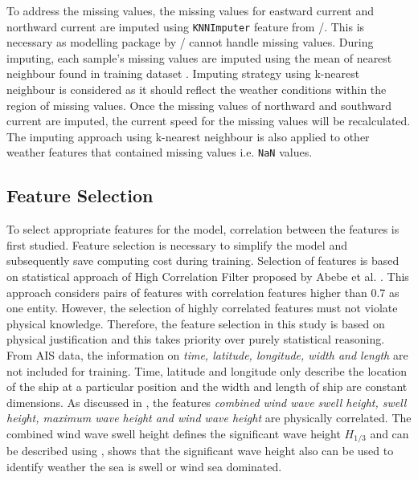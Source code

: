 To address the missing values, the missing values for eastward current and northward current are imputed using {\tt KNNImputer} feature from \scikit/. This is necessary as modelling package by \scikit/ cannot handle missing values. During imputing, each sample's missing values are imputed using the mean of nearest neighbour found in training dataset . Imputing strategy using k-nearest neighbour is considered as it should reflect the weather conditions within the region of missing values. Once the missing values of northward and southward current are imputed, the current speed for the missing values will be recalculated. The imputing approach using k-nearest neighbour is also applied to other weather features that contained missing values i.e. {\tt NaN} values.\\

\subsection{Feature Selection}\label{sec:feature_select}

To select appropriate features for the model, correlation between the features is first studied. Feature selection is necessary to simplify the model and subsequently save computing cost during training. Selection of features is based on statistical approach of High Correlation Filter proposed by Abebe et al. . This approach considers pairs of features with correlation features higher than 0.7 as one entity. However, the selection of highly correlated features must not violate physical knowledge. Therefore, the feature selection in this study is based on physical justification and this takes priority over purely statistical reasoning.\\

From AIS data, the information on \emph{time, latitude, longitude, width and length} are not included for training. Time, latitude and longitude only describe the location of the ship at a particular position and the width and length of ship are constant dimensions. As discussed in , the features \emph{combined wind wave swell height, swell height, maximum wave height and wind wave height} are physically correlated. The combined wind wave swell height defines the significant wave height $H_{1/3}$ and can be described using ,  shows that the significant wave height also can be used to identify weather the sea is swell or wind sea dominated.\\

